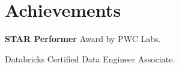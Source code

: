 \section{Achievements}
\small{
    \resumeItemListStart
       \item {\textbf{STAR Performer} Award by PWC Labs.}
        \item{Databricks Certified Data Engineer Associate.}
    \resumeItemListEnd
}